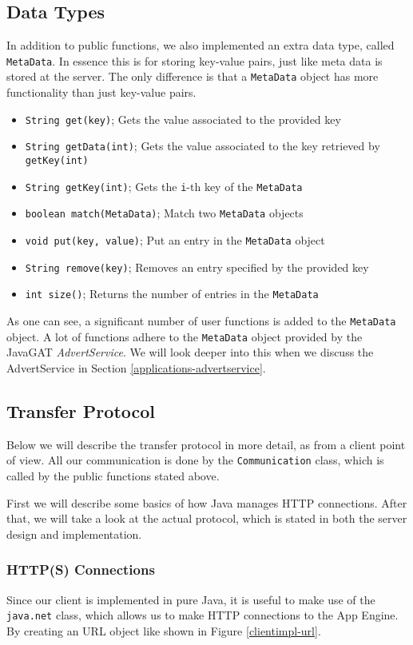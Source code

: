 \subsection{Data Types}
In addition to public functions, we also implemented an extra data type, called
\texttt{MetaData}. In essence this is for storing key-value pairs, just like
meta data is stored at the server. The only difference is that a
\texttt{MetaData} object has more functionality than just key-value pairs.

\begin{itemize}
	\item \texttt{String get(key)}; Gets the value associated to the provided key 
	\item \texttt{String getData(int)}; Gets the value associated to the key
		retrieved by \texttt{getKey(int)}
	\item \texttt{String getKey(int)}; Gets the \texttt{i}-th key of the
		\texttt{MetaData}
	\item \texttt{boolean match(MetaData)}; Match two \texttt{MetaData} objects 
	\item \texttt{void put(key, value)}; Put an entry in the \texttt{MetaData} object 
	\item \texttt{String remove(key)}; Removes an entry specified by the provided
		key
	\item \texttt{int size()}; Returns the number of entries in the \texttt{MetaData} 
\end{itemize}

As one can see, a significant number of user functions is added to the
\texttt{MetaData} object. A lot of functions adhere to the \texttt{MetaData}
object provided by the JavaGAT \emph{AdvertService}. We will look deeper into
this when we discuss the AdvertService in Section
\ref{applications-advertservice}.

\subsection{Transfer Protocol}
Below we will describe the transfer protocol in more detail, as from a client
point of view. All our communication is done by the \texttt{Communication}
class, which is called by the public functions stated above. 

First we will describe some basics of how Java manages HTTP connections. After
that, we will take a look at the actual protocol, which is stated in both the
server design and implementation.

\subsubsection{HTTP(S) Connections}
Since our client is implemented in pure Java, it is useful to make use of the
\texttt{java.net} class, which allows us to make HTTP connections to the
App Engine. By creating an URL object like shown in Figure \ref{clientimpl-url}.

